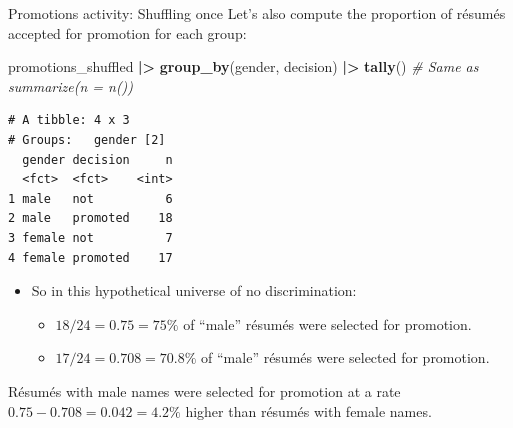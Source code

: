 \documentclass[
  ignorenonframetext,
]{beamer}
\newenvironment{Shaded}{\begin{snugshade}}{\end{snugshade}}
\newcommand{\CommentTok}[1]{\textcolor[rgb]{0.56,0.35,0.01}{\textit{#1}}}
\newcommand{\FunctionTok}[1]{\textcolor[rgb]{0.13,0.29,0.53}{\textbf{#1}}}
\newcommand{\NormalTok}[1]{#1}
\newcommand{\SpecialCharTok}[1]{\textcolor[rgb]{0.81,0.36,0.00}{\textbf{#1}}}
\providecommand{\tightlist}{%
  \setlength{\itemsep}{0pt}\setlength{\parskip}{0pt}}
\begin{document}
\begin{frame}[fragile]{Promotions activity: Shuffling once}
\protect\hypertarget{promotions-activity-shuffling-once-5}{}
Let's also compute the proportion of résumés accepted for promotion for
each group:

\tiny

\begin{Shaded}
\begin{Highlighting}[]
\NormalTok{promotions\_shuffled }\SpecialCharTok{|\textgreater{}} 
  \FunctionTok{group\_by}\NormalTok{(gender, decision) }\SpecialCharTok{|\textgreater{}} 
  \FunctionTok{tally}\NormalTok{() }\CommentTok{\# Same as summarize(n = n())}
\end{Highlighting}
\end{Shaded}

\begin{verbatim}
# A tibble: 4 x 3
# Groups:   gender [2]
  gender decision     n
  <fct>  <fct>    <int>
1 male   not          6
2 male   promoted    18
3 female not          7
4 female promoted    17
\end{verbatim}

\normalsize

\begin{itemize}
\item
  So in this hypothetical universe of no discrimination:

  \begin{itemize}
  \tightlist
  \item
    \(18/24=0.75=75\%\) of ``male'' résumés were selected for promotion.
  \item
    \(17/24=0.708=70.8\%\) of ``male'' résumés were selected for
    promotion.
  \end{itemize}
\end{itemize}

Résumés with male names were selected for promotion at a rate
\(0.75 -0.708 = 0.042 = 4.2\%\) higher than résumés with female names.
\end{frame}
\end{document}
